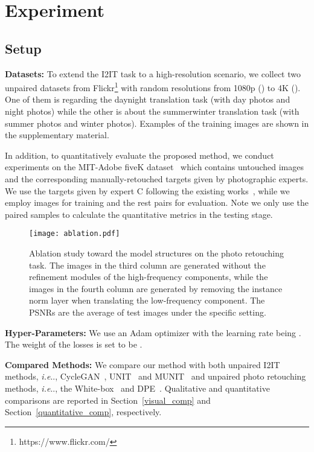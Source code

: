 \documentclass[10pt,twocolumn,letterpaper]{article}
\makeatletter
\DeclareRobustCommand\onedot{\futurelet\@let@token\@onedot}
\def\@onedot{\ifx\@let@token.\else.\null\fi\xspace}
\def\ie{\emph{i.e}\onedot} \def\Ie{\emph{I.e}\onedot}
\makeatother
\begin{document}
		
	\section{Experiment}
	
	\subsection{Setup}
	\label{tasks}
	
	\noindent\textbf{Datasets:} To extend the I2IT task to a high-resolution scenario, we collect two unpaired datasets from Flickr\footnote{https://www.flickr.com/} with random resolutions from 1080p () to 4K (). One of them is regarding the daynight translation task (with  day photos and  night photos) while the other is about the summerwinter translation task (with  summer photos and  winter photos). Examples of the training images are shown in the supplementary material.
	
		In addition, to quantitatively evaluate the proposed method, we conduct experiments on the MIT-Adobe fiveK dataset~\cite{bychkovsky2011learning} which contains  untouched images and the corresponding manually-retouched targets given by photographic experts. We use the targets given by expert C following the existing works~\cite{chen2018deep}, while we employ  images for training and the rest  pairs for evaluation. Note we only use the paired samples to calculate the quantitative metrics in the testing stage.
	
	
	\begin{figure*}[t]
		\centering
		\texttt{[image: ablation.pdf]}
		\caption{Ablation study toward the model structures on the photo retouching task. The images in the third column are generated without the refinement modules of the high-frequency components, while the images in the fourth column are generated by removing the instance norm layer when translating the low-frequency component. The PSNRs are the average of  test images under the specific setting.
			\label{ablation_model}}
	\end{figure*}
	
		
	\noindent\textbf{Hyper-Parameters:} We use an Adam optimizer with the learning rate being . The weight of the losses is set to be .
	
	\noindent\textbf{Compared Methods:} We compare our method with both unpaired I2IT methods, \ie, CycleGAN~\cite{zhu2017unpaired}, UNIT~\cite{liu2017unsupervised} and MUNIT~\cite{huang2018multimodal} and unpaired photo retouching methods, \ie, the White-box~\cite{hu2018exposure} and DPE~\cite{chen2018deep}. Qualitative and quantitative comparisons are reported in Section~\ref{visual_comp} and Section~\ref{quantitative_comp}, respectively.
	
\end{document}
